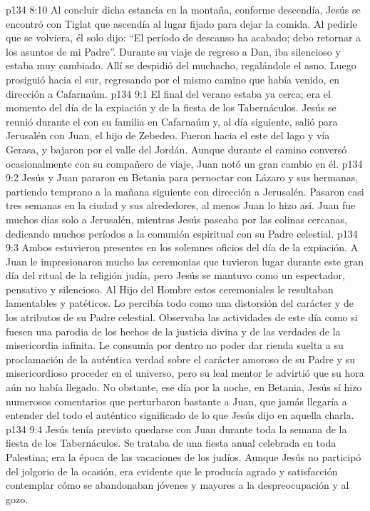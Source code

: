 \vs p134 8:10 Al concluir dicha estancia en la montaña, conforme descendía, Jesús se encontró con Tiglat que ascendía al lugar fijado para dejar la comida. Al pedirle que se volviera, él solo dijo: “El período de descanso ha acabado; debo retornar a los asuntos de mi Padre”. Durante su viaje de regreso a Dan, iba silencioso y estaba muy cambiado. Allí se despidió del muchacho, regalándole el asno. Luego prosiguió hacia el sur, regresando por el mismo camino que había venido, en dirección a Cafarnaúm.
\vs p134 9:1 El final del verano estaba ya cerca; era el momento del día de la expiación y de la fiesta de los Tabernáculos. Jesús se reunió durante el  con su familia en Cafarnaúm y, al día siguiente, salió para Jerusalén con Juan, el hijo de Zebedeo. Fueron hacia el este del lago y vía Gerasa, y bajaron por el valle del Jordán. Aunque durante el camino conversó ocasionalmente con su compañero de viaje, Juan notó un gran cambio en él.
\vs p134 9:2 Jesús y Juan pararon en Betania para pernoctar con Lázaro y sus hermanas, partiendo temprano a la mañana siguiente con dirección a Jerusalén. Pasaron casi tres semanas en la ciudad y sus alrededores, al menos Juan lo hizo así. Juan fue muchos días solo a Jerusalén, mientras Jesús paseaba por las colinas cercanas, dedicando muchos períodos a la comunión espiritual con su Padre celestial.
\vs p134 9:3 Ambos estuvieron presentes en los solemnes oficios del día de la expiación. A Juan le impresionaron mucho las ceremonias que tuvieron lugar durante este gran día del ritual de la religión judía, pero Jesús se mantuvo como un espectador, pensativo y silencioso. Al Hijo del Hombre estos ceremoniales le resultaban lamentables y patéticos. Lo percibía todo como una distorsión del carácter y de los atributos de su Padre celestial. Observaba las actividades de este día como si fuesen una parodia de los hechos de la justicia divina y de las verdades de la misericordia infinita. Le consumía por dentro no poder dar rienda suelta a su proclamación de la auténtica verdad sobre el carácter amoroso de su Padre y su misericordioso proceder en el universo, pero su leal mentor le advirtió que su hora aún no había llegado. No obstante, ese día por la noche, en Betania, Jesús sí hizo numerosos comentarios que perturbaron bastante a Juan, que jamás llegaría a entender del todo el auténtico significado de lo que Jesús dijo en aquella charla.
\vs p134 9:4 Jesús tenía previsto quedarse con Juan durante toda la semana de la fiesta de los Tabernáculos. Se trataba de una fiesta anual celebrada en toda Palestina; era la época de las vacaciones de los judíos. Aunque Jesús no participó del jolgorio de la ocasión, era evidente que le producía agrado y satisfacción contemplar cómo se abandonaban jóvenes y mayores a la despreocupación y al gozo.

